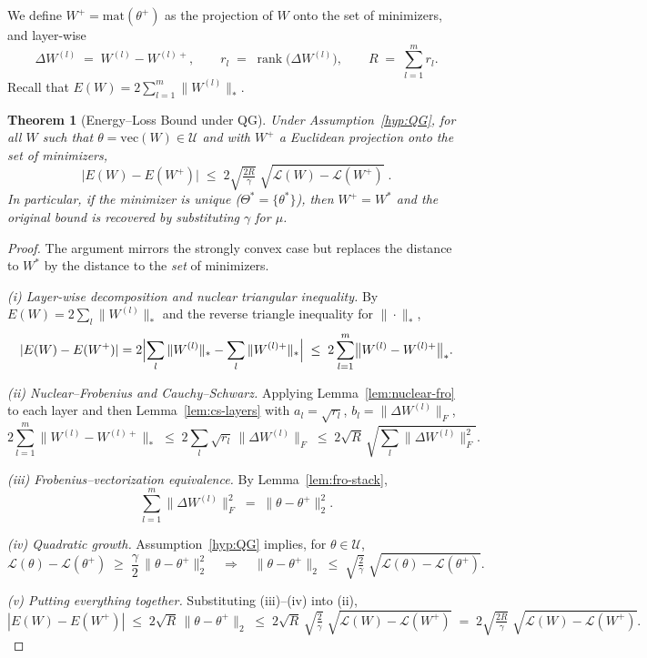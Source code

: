 \documentclass[a4paper,fleqn]{cas-sc}
\DeclareMathOperator{\rank}{rank}
\newtheorem{theorem}{Theorem}
\theoremstyle{remark}
\theoremstyle{definition}
\begin{document}
We define $W^+=\mathrm{mat}(\theta^+)$ as the projection of $W$ onto the set of minimizers, and layer-wise
\[
\Delta W^{(l)} \;=\; W^{(l)}-W^{(l)+}, \qquad
r_l \;=\; \rank\!\bigl(\Delta W^{(l)}\bigr), \qquad
R \;=\; \sum_{l=1}^m r_l.
\]
Recall that $E(W)=2\sum_{l=1}^m \|W^{(l)}\|_*$.

\begin{theorem}[Energy–Loss Bound under QG]\label{thm:qg}
Under Assumption~\ref{hyp:QG}, for all $W$ such that $\theta=\mathrm{vec}(W)\in\mathcal{U}$ and with $W^+$ a Euclidean projection onto the set of minimizers,
\[
\boxed{\quad
\bigl|E(W)-E(W^+)\bigr|
\;\le\;
2\sqrt{\tfrac{2R}{\gamma}}\;\sqrt{\mathcal{L}(W)-\mathcal{L}(W^+)}\;.
\quad}
\]
In particular, if the minimizer is unique ($\Theta^*=\{\theta^*\}$), then $W^+=W^*$ and the original bound is recovered by substituting $\gamma$ for $\mu$.
\end{theorem}

\begin{proof}
The argument mirrors the strongly convex case but replaces the distance to $W^*$ by the distance to the \emph{set} of minimizers.

\emph{(i) Layer-wise decomposition and nuclear triangular inequality.}
By $E(W)=2\sum_l \|W^{(l)}\|_*$ and the reverse triangle inequality for $\|\cdot\|_*$,
\[
|E(W)-E(W^+)|
=2\Bigl|\sum_l \|W^{(l)}\|_*-\sum_l \|W^{(l)+}\|_*\Bigr|
\;\le\; 2\sum_{l=1}^m \bigl\|W^{(l)}-W^{(l)+}\bigr\|_*.
\]

\emph{(ii) Nuclear–Frobenius and Cauchy–Schwarz.}
Applying Lemma~\ref{lem:nuclear-fro} to each layer and then Lemma~\ref{lem:cs-layers} with $a_l=\sqrt{r_l}$, $b_l=\|\Delta W^{(l)}\|_F$,
\[
2\sum_{l=1}^m \bigl\|W^{(l)}-W^{(l)+}\bigr\|_*
\;\le\; 2\sum_l \sqrt{r_l}\,\|\Delta W^{(l)}\|_F
\;\le\; 2\sqrt{R}\,\sqrt{\sum_l \|\Delta W^{(l)}\|_F^2}.
\]

\emph{(iii) Frobenius–vectorization equivalence.}
By Lemma~\ref{lem:fro-stack},
\[
\sum_{l=1}^m \|\Delta W^{(l)}\|_F^2 \;=\; \|\theta-\theta^+\|_2^2.
\]

\emph{(iv) Quadratic growth.}
Assumption~\ref{hyp:QG} implies, for $\theta\in\mathcal{U}$,
\[
\mathcal{L}(\theta)-\mathcal{L}(\theta^+)
\;\ge\; \frac{\gamma}{2}\,\|\theta-\theta^+\|_2^2
\quad\Longrightarrow\quad
\|\theta-\theta^+\|_2 \;\le\; \sqrt{\tfrac{2}{\gamma}}\;\sqrt{\mathcal{L}(\theta)-\mathcal{L}(\theta^+)}.
\]

\emph{(v) Putting everything together.}
Substituting (iii)–(iv) into (ii),
\[
|E(W)-E(W^+)|
\;\le\; 2\sqrt{R}\,\|\theta-\theta^+\|_2
\;\le\; 2\sqrt{R}\,\sqrt{\tfrac{2}{\gamma}}\;\sqrt{\mathcal{L}(W)-\mathcal{L}(W^+)}
\;=\; 2\sqrt{\tfrac{2R}{\gamma}}\;\sqrt{\mathcal{L}(W)-\mathcal{L}(W^+)}.
\]
\end{proof}
\end{document}
